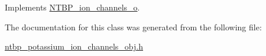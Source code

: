 Implements \hyperlink{class_n_t_b_p__ion__channels__o_a6c865e74014bef8bc9ae547e4835ec81}{NTBP\_\-ion\_\-channels\_\-o}.



The documentation for this class was generated from the following file:\begin{DoxyCompactItemize}
\item 
\hyperlink{ntbp__potassium__ion__channels__obj_8h}{ntbp\_\-potassium\_\-ion\_\-channels\_\-obj.h}\end{DoxyCompactItemize}
